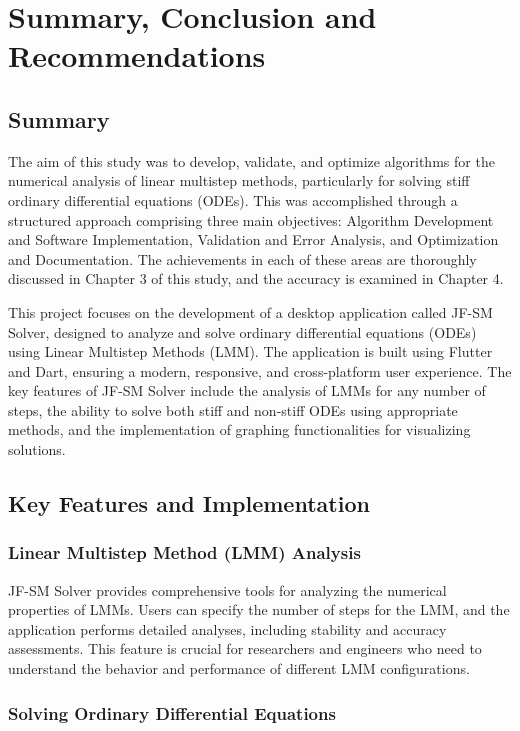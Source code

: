 
\chapter{Summary, Conclusion and Recommendations}

\section{Summary}
The aim of this study was to develop, validate, and optimize algorithms for the numerical analysis of linear multistep methods, particularly for solving stiff ordinary differential equations (ODEs). This was accomplished through a structured approach comprising three main objectives: Algorithm Development and Software Implementation, Validation and Error Analysis, and Optimization and Documentation. The achievements in each of these areas are thoroughly discussed in Chapter 3 of this study, and the accuracy is examined in Chapter 4.

This project focuses on the development of a desktop application called JF-SM Solver, designed to analyze and solve ordinary differential equations (ODEs) using Linear Multistep Methods (LMM). The application is built using Flutter and Dart, ensuring a modern, responsive, and cross-platform user experience. The key features of JF-SM Solver include the analysis of LMMs for any number of steps, the ability to solve both stiff and non-stiff ODEs using appropriate methods, and the implementation of graphing functionalities for visualizing solutions.

\section{Key Features and Implementation}

\subsection{Linear Multistep Method (LMM) Analysis}

JF-SM Solver provides comprehensive tools for analyzing the numerical properties of LMMs. Users can specify the number of steps for the LMM, and the application performs detailed analyses, including stability and accuracy assessments. This feature is crucial for researchers and engineers who need to understand the behavior and performance of different LMM configurations.

\subsection{Solving Ordinary Differential Equations}

